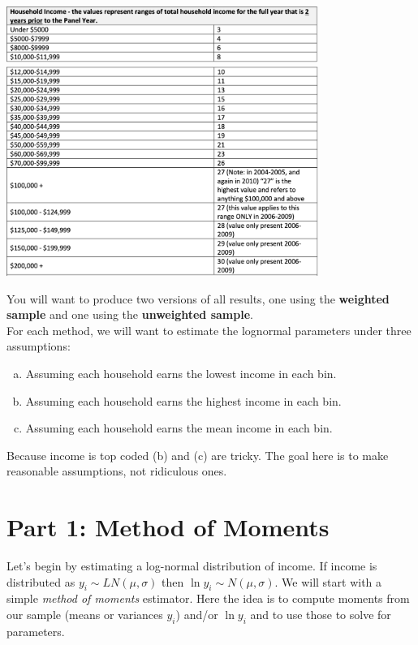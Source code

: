 \documentclass{article}
\begin{document}
\begin{center}
\includegraphics[width=4in]{./income_1.png}\\
\includegraphics[width=4in]{./income_2.png}
\end{center}
\noindent You will want to produce two versions of all results, one using the \textbf{weighted sample} and one using the \textbf{unweighted sample}.\\

\noindent For each method, we will want to estimate the lognormal parameters under three assumptions:
\begin{enumerate}[(a)]
\item Assuming each household earns the lowest income in each bin.
\item Assuming each household earns the highest income in each bin.
\item Assuming each household earns the mean income in each bin.
\end{enumerate}
Because income is top coded (b) and (c) are tricky. The goal here is to make reasonable assumptions, not ridiculous ones.

\section*{\normalsize Part 1: Method of Moments}
Let's begin by estimating a log-normal distribution of income. If income is distributed as $y_i  \sim LN (\mu,\sigma)$ then $\ln y_i \sim N(\mu,\sigma)$. We will start with a simple \textit{method of moments} estimator. Here the idea is to compute moments from our sample (means or variances $y_i$) and/or $\ln y_i$ and to use those to solve for parameters.
\end{document}
